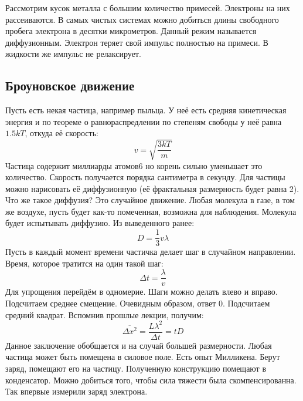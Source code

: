 \documentclass[a4paper, 12pt]{article}
\begin{document}
	Рассмотрим кусок металла с большим количество примесей. Электроны на них рассеиваются. В самых чистых системах можно добиться длины свободного пробега электрона в десятки микрометров. Данный режим называется диффузионным. Электрон теряет свой импульс полностью на примеси. В жидкости же импульс не релаксирует.
	
	\subsection{Броуновское движение}
	Пусть есть некая частица, например пыльца. У неё есть средняя кинетическая энергия и по теореме о равнораспредлении по степеням свободы у неё равна $1.5 kT$, откуда её скорость:
	\begin{equation*}
		v = \sqrt{\frac{3kT}{m}}
	\end{equation*}
	Частица содержит миллиарды атомов6 но корень сильно уменьшает это количество. Скорость получается порядка сантиметра в секунду. Для частицы можно нарисовать её диффузионную  (её фрактальная размерность будет равна 2). Что же такое диффузия? Это случайное движение. Любая молекула в газе, в том же воздухе, пусть будет как-то помеченная, возможна для наблюдения. Молекула будет испытывать диффузию. Из выведенного ранее:
	\begin{equation*}
		D = \frac{1}{3} v \lambda
	\end{equation*}
	Пусть в каждый момент времени частичка делает шаг в случайном направлении. Время, которое тратится на один такой шаг:
	\begin{equation*}
		\Delta t = \frac{\lambda}{v}
	\end{equation*}
	Для упрощения перейдём в одномерие. Шаги можно делать влево и вправо. Подсчитаем среднее смещение. Очевидным образом, ответ 0. Подсчитаем средний квадрат. Вспомнив прошлые лекции, получим:
	\begin{equation*}
		\overline{\Delta x^{2}} = \frac{L \lambda^{2}}{\Delta t} = tD
	\end{equation*}
	Данное заключение обобщается и на случай большей размерности. Любая частица может быть помещена в силовое поле. Есть опыт Милликена. Берут заряд, помещают его на частицу. Полученную конструкцию помещают в конденсатор. Можно добиться того, чтобы сила тяжести была скомпенсированна. Так впервые измерили заряд электрона.
\end{document}
